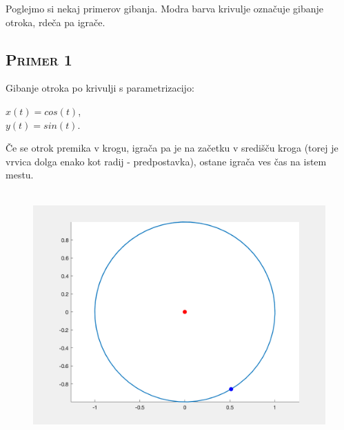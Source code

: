 \documentclass[a4paper,12pt]{article}
\begin{document}
Poglejmo si nekaj primerov gibanja. Modra barva krivulje označuje gibanje otroka, rdeča pa igrače.

\subsection{\textsc{Primer 1}}
    
     Gibanje otroka po krivulji s parametrizacijo:
    \begin{center}
    $x(t) = cos(t)$, \\
    $y(t) = sin(t)$. 
    \end{center}
    Če se otrok premika v krogu, igrača pa je na začetku v središču kroga (torej je vrvica dolga enako kot radij - predpostavka), ostane igrača ves čas na istem mestu.
    \\
    \\
    \begin{figure}[!h]
        \centering
        \includegraphics[scale=0.4]{Primer1}
    \end{figure}

    \newpage
   
\end{document}
